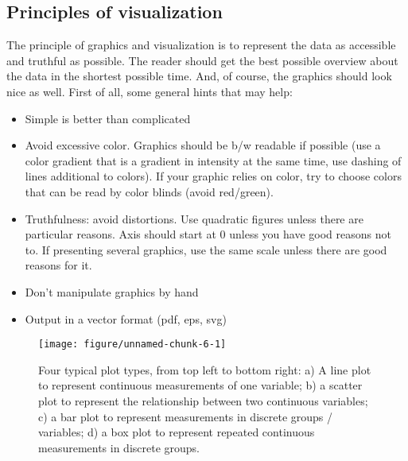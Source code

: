 \documentclass[a4paper,twoside]{tufte-book}\usepackage[]{graphicx}\usepackage[]{color}
\makeatletter
\def\maxwidth{ %
  \ifdim\Gin@nat@width>\linewidth
    \linewidth
  \else
    \Gin@nat@width
  \fi
}
\makeatother
\begin{document}
\subsection{Principles of visualization}

The principle of graphics and visualization is to represent the data as accessible and truthful as possible. The reader should get the best possible overview about the data in the shortest possible time. And, of course, the graphics should look nice as well. First of all, some general hints that may help:

\begin{itemize}
\item Simple is better than complicated
\item Avoid excessive color. Graphics should be b/w readable if possible (use a color gradient that is a gradient in intensity at the same time, use dashing of lines additional to colors). If your graphic relies on color, try to choose colors that can be read by color blinds (avoid red/green).
\item Truthfulness: avoid distortions. Use quadratic figures unless there are particular reasons. Axis should start at 0 unless you have good reasons not to. If presenting several graphics, use the same scale unless there are good reasons for it. 
\item Don't manipulate graphics by hand
\item Output in a vector format (pdf, eps, svg)
\end{itemize}

\begin{figure}[htbp]
\begin{center}

\begin{Schunk}

\texttt{[image: figure/unnamed-chunk-6-1]} \end{Schunk}
\caption{Four typical plot types, from top left to bottom right: a) A line plot to represent continuous measurements of one variable; b) a scatter plot to represent the relationship between two continuous variables; c) a bar plot to represent measurements in discrete groups / variables; d) a box plot to represent repeated continuous measurements in discrete groups.}
\label{fig: exaple plots}
\end{center}
\end{figure}
\end{document}

